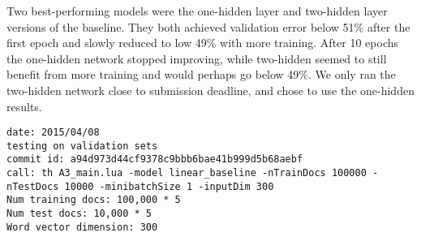 \documentclass{article} %
\begin{document}
Two best-performing models were the one-hidden layer and two-hidden layer versions of the baseline. They both achieved validation error below 51\% after the first epoch and slowly reduced to low 49\% with more training. After 10 epochs the one-hidden network stopped improving, while two-hidden seemed to still benefit from more training and would perhaps go below 49\%. We only ran the two-hidden network close to submission deadline, and chose to use the one-hidden results.

\begin{lstlisting}
date: 2015/04/08
testing on validation sets
commit id: a94d973d44cf9378c9bbb6bae41b999d5b68aebf
call: th A3_main.lua -model linear_baseline -nTrainDocs 100000 -nTestDocs 10000 -minibatchSize 1 -inputDim 300
Num training docs: 100,000 * 5
Num test docs: 10,000 * 5
Word vector dimension: 300
\end{lstlisting}

	

	
\end{document}

